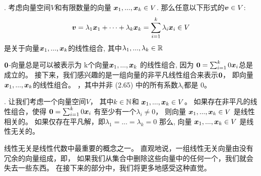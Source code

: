\begin{definition}[线性组合].
    考虑向量空间$V$和有限数量的向量
    $\boldsymbol{x}_1,...,\boldsymbol{x}_k \in V$.
    那么任意以下形式的$\boldsymbol{v} \in V$:
    \begin{equation}
        \boldsymbol{v} = \lambda_1\boldsymbol{x}_1 + \cdots
        + \lambda_k \boldsymbol{x}_k=
        \sum_{i=1}^{k}\lambda_i \boldsymbol{x}_i \in V
    \end{equation}
    是关于向量$\boldsymbol{x}_1,...,\boldsymbol{x}_k$的线性组合,
    其中$\lambda_1,...,\lambda_k \in \mathbb{R}$
\end{definition}

$\boldsymbol{0}$-向量总是可以被表示为
k个向量$\boldsymbol{x}_1,...,\boldsymbol{x}_k$
的线性组合, 因为
$\boldsymbol{0} = \sum_{i=1}^{k}0\boldsymbol{x}_i$总是成立的。
接下来，我们感兴趣的是一组向量的非平凡线性组合来表示$\boldsymbol{0}$，
即向量$\boldsymbol{x}_1,...,\boldsymbol{x}_k$的线性组合。
，其中并非 (2.65) 中的所有系数$\lambda_i$都是 0。

\begin{definition}[线性无关(相关)].
    让我们考虑一个向量空间$V$，
    其中$k \in \mathbb{N}$和
    $\boldsymbol{x}_1,...,\boldsymbol{x}_k \in V$。
    如果存在非平凡的线性组合，使得
    $\boldsymbol{0} = \sum_{i=1}^{k}0\boldsymbol{x}_i$
    有至少有一个$\lambda_i \neq 0$，
    则向量 $\boldsymbol{x}_1,...,\boldsymbol{x}_k \in V$
    是线性相关的。
    如果仅存在平凡解，即$\lambda_1 = ... = \lambda_k = 0$
    那么,
    向量 $\boldsymbol{x}_1,...,\boldsymbol{x}_k \in V$
    是线性无关的。
\end{definition}

线性无关是线性代数中最重要的概念之一。
直观地说，一组线性无关向量由没有冗余的向量组成，即，
如果我们从集合中删除这些向量中的任何一个，我们就会失去一些东西。
在接下来的部分中，我们将更多地感受这种直觉。

